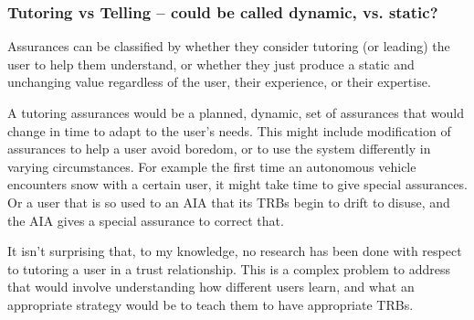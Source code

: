 \subsubsection{Tutoring vs Telling -- \textbf{could be called dynamic, vs. static?}} \label{sec:teach_tell}
    Assurances can be classified by whether they consider tutoring (or leading) the user to help them understand, or whether they just produce a static and unchanging value regardless of the user, their experience, or their expertise.

    A tutoring assurances would be a planned, dynamic, set of assurances that would change in time to adapt to the user's needs. This might include modification of assurances to help a user avoid boredom, or to use the system differently in varying circumstances. For example the first time an autonomous vehicle encounters snow with a certain user, it might take time to give special assurances. Or a user that is so used to an AIA that its TRBs begin to drift to disuse, and the AIA gives a special assurance to correct that.

    It isn't surprising that, to my knowledge, no research has been done with respect to tutoring a user in a trust relationship. This is a complex problem to address that would involve understanding how different users learn, and what an appropriate strategy would be to teach them to have appropriate TRBs.
